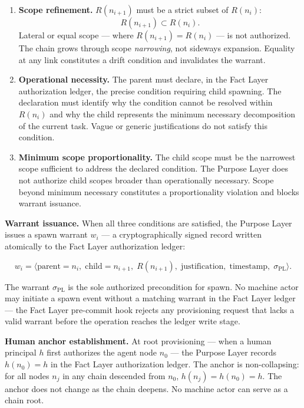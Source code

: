 \begin{enumerate}
    \item[(P1)] \textbf{Scope refinement.} $R(n_{i+1})$ must be a strict subset of $R(n_i)$:
    \begin{equation}
    R(n_{i+1}) \subset R(n_i).
    \label{eq:rs-scope-refinement}
    \end{equation}
    Lateral or equal scope — where $R(n_{i+1}) = R(n_i)$ — is not authorized. The chain grows through scope \emph{narrowing}, not sideways expansion. Equality at any link constitutes a drift condition and invalidates the warrant.

    \item[(P2)] \textbf{Operational necessity.} The parent must declare, in the Fact Layer authorization ledger, the precise condition requiring child spawning. The declaration must identify why the condition cannot be resolved within $R(n_i)$ and why the child represents the minimum necessary decomposition of the current task. Vague or generic justifications do not satisfy this condition.

    \item[(P3)] \textbf{Minimum scope proportionality.} The child scope must be the narrowest scope sufficient to address the declared condition. The Purpose Layer does not authorize child scopes broader than operationally necessary. Scope beyond minimum necessary constitutes a proportionality violation and blocks warrant issuance.
\end{enumerate}

\medskip
\noindent\textbf{Warrant issuance.} When all three conditions are satisfied, the Purpose Layer issues a spawn warrant $w_i$ — a cryptographically signed record written atomically to the Fact Layer authorization ledger:

\begin{equation}
w_i = \bigl\langle
\text{parent}=n_i,\;
\text{child}=n_{i+1},\;
R(n_{i+1}),\;
\text{justification},\;
\text{timestamp},\;
\sigma_{\text{PL}}
\bigr\rangle .
\label{eq:rs-spawn-warrant}
\end{equation}

The warrant $\sigma_{\text{PL}}$ is the sole authorized precondition for spawn. No machine actor may initiate a spawn event without a matching warrant in the Fact Layer ledger — the Fact Layer pre-commit hook rejects any provisioning request that lacks a valid warrant before the operation reaches the ledger write stage.

\medskip
\noindent\textbf{Human anchor establishment.} At root provisioning — when a human principal $h$ first authorizes the agent node $n_0$ — the Purpose Layer records $h(n_0) = h$ in the Fact Layer authorization ledger. The anchor is non-collapsing: for all nodes $n_j$ in any chain descended from $n_0$, $h(n_j) = h(n_0) = h$. The anchor does not change as the chain deepens. No machine actor can serve as a chain root.

